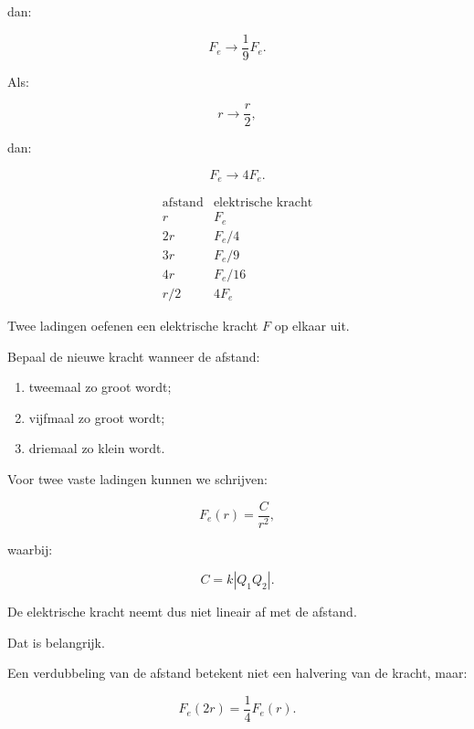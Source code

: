 \documentclass{ximera}
\begin{document}
dan:

\[
F_e\rightarrow\frac19F_e.
\]

Als:

\[
r\rightarrow\frac r2,
\]

dan:

\[
F_e\rightarrow4F_e.
\]


\begin{center}
\[
\boxed{
\begin{array}{c|c}
\text{afstand} & \text{elektrische kracht}\\
\hline
r & F_e\\
2r & F_e/4\\
3r & F_e/9\\
4r & F_e/16\\
r/2 & 4F_e
\end{array}
}
\]
\end{center}


\begin{oefening}[Afstand]{\oefB\ESS}

Twee ladingen oefenen een elektrische kracht $F$ op elkaar uit.

Bepaal de nieuwe kracht wanneer de afstand:

\begin{enumerate}
  \item tweemaal zo groot wordt;
  \item vijfmaal zo groot wordt;
  \item driemaal zo klein wordt.
\end{enumerate}

\end{oefening}




Voor twee vaste ladingen kunnen we schrijven:

\[
F_e(r)=\frac{C}{r^2},
\]

waarbij:

\[
C=k|Q_1Q_2|.
\]

De elektrische kracht neemt dus niet lineair af met de afstand.

Dat is belangrijk.

Een verdubbeling van de afstand betekent niet een halvering van de
kracht, maar:

\[
\boxed{
F_e(2r)=\frac14F_e(r).
}
\]
\end{document}
